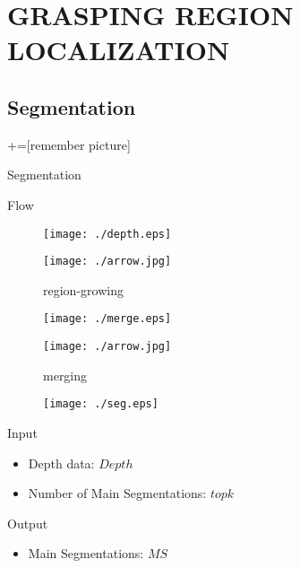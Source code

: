 \documentclass[xcolor=table,compress,blue]{beamer}
\begin{document}
\section{GRASPING REGION LOCALIZATION}
\subsection{Segmentation}
\label{ALG-SEG}
+=[remember picture] %
\begin{frame}{Segmentation}
	\begin{exampleblock}{Flow}
		\begin{figure}[htpb]
			\centering
			\begin{minipage}[b]{0.8in}
				\centerline{ \texttt{[image: ./depth.eps]} }
			\end{minipage}
			\begin{minipage}[b]{0.8in}
				\centerline{ \texttt{[image: ./arrow.jpg]} }
				\centerline{\tiny{region-growing}}
			\end{minipage}
			\begin{minipage}[b]{0.8in}
				\centerline{ \texttt{[image: ./merge.eps]} }
			\end{minipage}
			\begin{minipage}[b]{0.8in}
				\centerline{ \texttt{[image: ./arrow.jpg]} }
				\centerline{\tiny{merging}}
			\end{minipage}
			\begin{minipage}[b]{0.8in}
				\centerline{ \texttt{[image: ./seg.eps]} }
			\end{minipage}
		\end{figure}
	\end{exampleblock}
	\begin{exampleblock}{Input}
		\begin{itemize}		
			\item  Depth data: $Depth$
			\item  Number of Main Segmentations: ${topk}$
		\end{itemize}
	\end{exampleblock}
	\begin{exampleblock}{Output}
		\begin{itemize}		
			\item  Main Segmentations: ${MS}$
		\end{itemize}
	\end{exampleblock}
\end{frame}
\end{document}
